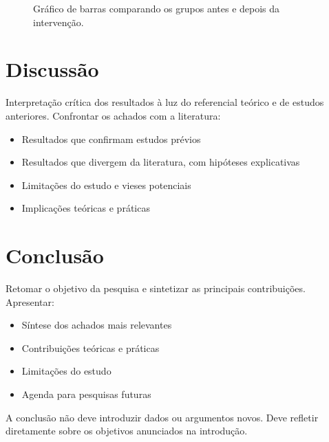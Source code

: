 \documentclass[preprint,12pt,review]{elsarticle}
\begin{document}
\begin{figure}[H]
\centering
\caption{Gráfico de barras comparando os grupos antes e depois da intervenção.}
\label{fig:resultados}
\end{figure}

\section{Discussão}

Interpretação crítica dos resultados à luz do referencial teórico e de
estudos anteriores. Confrontar os achados com a literatura:
\begin{itemize}
  \item Resultados que confirmam estudos prévios
  \item Resultados que divergem da literatura, com hipóteses explicativas
  \item Limitações do estudo e vieses potenciais
  \item Implicações teóricas e práticas
\end{itemize}

\section{Conclusão}

Retomar o objetivo da pesquisa e sintetizar as principais contribuições.
Apresentar:
\begin{itemize}
  \item Síntese dos achados mais relevantes
  \item Contribuições teóricas e práticas
  \item Limitações do estudo
  \item Agenda para pesquisas futuras
\end{itemize}

A conclusão não deve introduzir dados ou argumentos novos. Deve refletir
diretamente sobre os objetivos anunciados na introdução.

\end{document}
